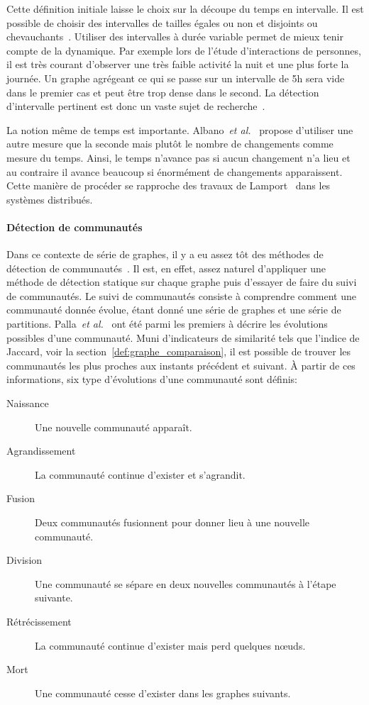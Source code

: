 Cette définition initiale laisse le choix sur la découpe du temps en intervalle.
Il est possible de choisir des intervalles de tailles égales ou non et disjoints ou chevauchants~\cite{Wang2012}.
Utiliser des intervalles à durée variable permet de mieux tenir compte de la dynamique.
Par exemple lors de l'étude d'interactions de personnes, il est très courant d'observer une très faible activité la nuit et une plus forte la journée.
Un graphe agrégeant ce qui se passe sur un intervalle de 5h sera vide dans le premier cas et peut être trop dense dans le second.
La détection d'intervalle pertinent est donc un vaste sujet de recherche~\cite{Rosvall2010,Krings2012,Ribeiro2013,Caceres2013,Peel2015,de2016detection}.

La notion même de temps est importante.
Albano~\emph{et al.}~\cite{Albano2014} propose d'utiliser une autre mesure que la seconde mais plutôt le nombre de changements comme mesure du temps.
Ainsi, le temps n'avance pas si aucun changement n'a lieu et au contraire il avance beaucoup si énormément de changements apparaissent.
Cette manière de procéder se rapproche des travaux de Lamport~\cite{Lamport1978} dans les systèmes distribués.

\paragraph{Détection de communautés}
Dans ce contexte de série de graphes, il y a eu assez tôt des méthodes de détection de communautés~\cite{Hopcroft2004,Sun2007,Lin2008,Asur2009}.
Il est, en effet, assez naturel d'appliquer une méthode de détection statique sur chaque graphe puis d'essayer de faire du suivi de communautés.
Le suivi de communautés consiste à comprendre comment une communauté donnée évolue, étant donné une série de graphes et une série de partitions.
Palla~\emph{et al.}~\cite{Palla2007} ont été parmi les premiers à décrire les évolutions possibles d'une communauté.
Muni d'indicateurs de similarité tels que l'indice de Jaccard, voir la section~\ref{def:graphe_comparaison}, il est possible de trouver les communautés les plus proches aux instants précédent et suivant.
\`A partir de ces informations, six type d'évolutions d'une communauté sont définis:
\begin{description}
\item[Naissance] Une nouvelle communauté apparaît.
\item[Agrandissement] La communauté continue d'exister et s'agrandit.
\item[Fusion] Deux communautés fusionnent pour donner lieu à une nouvelle communauté.
\item[Division] Une communauté se sépare en deux nouvelles communautés à l'étape suivante.
\item[Rétrécissement] La communauté continue d'exister mais perd quelques n\oe{}uds.
\item[Mort] Une communauté cesse d'exister dans les graphes suivants.
\end{description}

